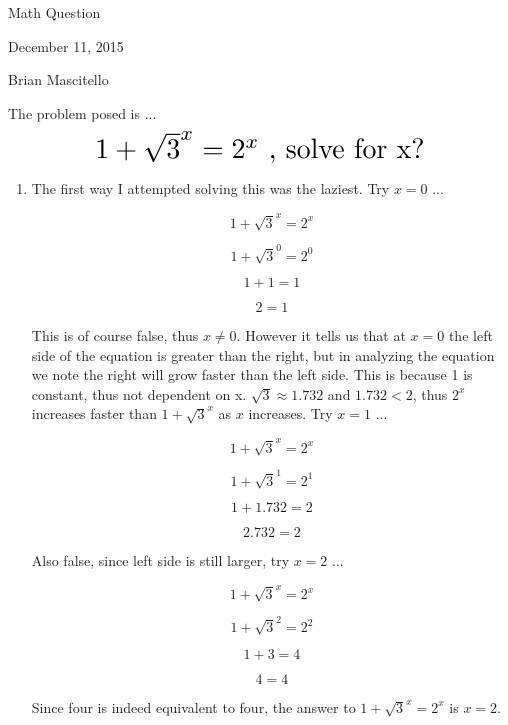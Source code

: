 \documentclass[12pt]{article}
\begin{document}
\begin{titlepage}
\begin{center}

\huge{Math Question}
\vspace{1 cm}

\huge{December 11, 2015}
\vspace{1 cm}

\huge{Brian Mascitello}

\end{center}
\end{titlepage}


The problem posed is ...
\[ \scalebox{2}{$1 + \sqrt{3}^x = 2^{x}$ , solve for x?} \]

\begin{enumerate}[label=\textbf{\arabic*}.]

\item The first way I attempted solving this was the laziest. Try $x = 0$ ...

$$1 + \sqrt{3}^x = 2^{x}$$

$$1 + \sqrt{3}^0 = 2^{0}$$

$$1 + 1 = 1$$

$$2 = 1$$

This is of course false, thus $x \neq 0$. However it tells us that at $x = 0$ the left side of the equation is greater than the right, but in analyzing the equation we note the right will grow faster than the left side. This is because 1 is constant, thus not dependent on x. $\sqrt{3} \approx 1.732$ and $1.732 < 2$, thus $2^{x}$ increases faster than $1 + \sqrt{3}^x$ as $x$ increases. Try $x = 1$ ...

$$1 + \sqrt{3}^x = 2^{x}$$

$$1 + \sqrt{3}^1 = 2^{1}$$

$$1 + 1.732 = 2$$

$$2.732 = 2$$

Also false, since left side is still larger, try $x = 2$ ...

$$1 + \sqrt{3}^x = 2^{x}$$

$$1 + \sqrt{3}^2 = 2^{2}$$

$$1 + 3 = 4$$

$$4 = 4$$

Since four is indeed equivalent to four, the answer to $1 + \sqrt{3}^x = 2^{x}$ is $x = 2$.



\end{enumerate}
\end{document}
